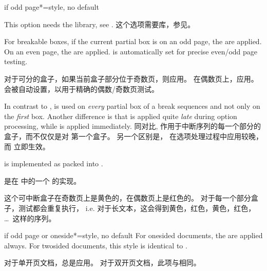 \begin{docTcbKey}[][doc new=2015-11-13]{if odd page*}{=}{style, no default}
\begin{marker}
 This option needs the  library, see .
这个选项需要库，参见。
\end{marker}
 For breakable boxes, if the current partial box is on an odd page, the  are applied.
 On an even page, the  are applied.
  is automatically set for precise even/odd page testing.

对于可分的盒子，如果当前盒子部分位于奇数页，则应用。%
在偶数页上，应用。%
会被自动设置，以用于精确的偶数/奇数页测试。

 In contrast to ,  is used
 on \emph{every} partial box of a break sequences and not only on the
 \emph{first} box. Another difference is that 
 is applied quite \emph{late} during option processing, while
  is applied immediately.
同对比,  作用于中断序列的每一个部分的盒子，而不仅仅是对
第一个盒子。%
另一个区别是，  在选项处理过程中应用较晚，而  立即生效。

  is implemented as 
 packed into .

 是在  中的一个  的实现。

\begin{dispExample}
\begin{tcolorbox}[breakable,if odd page*={colback=yellow!50}{colback=red!50}]
这个可中断盒子在奇数页上是黄色的，在偶数页上是红色的。%
对于每一个部分盒子，测试都会重复执行， i.e. 对于长文本，这会得到黄色，红色，黄色，红色， \ldots\ 这样的序列。
\end{tcolorbox}
\end{dispExample}
\end{docTcbKey}




\begin{docTcbKey}[][doc new=2016-11-18]{if odd page or oneside*}{=}{style, no default}
 For onesided documents, the  are applied always.
 For twosided documents, this style is identical to .

对于单开页文档，总是应用。%
对于双开页文档，此项与相同。
\end{docTcbKey}



